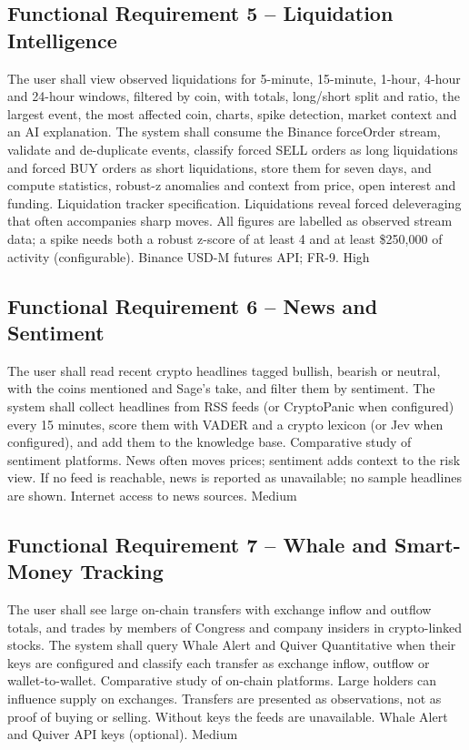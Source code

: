 \subsection{Functional Requirement 5 -- Liquidation Intelligence}
{The user shall view observed liquidations for 5-minute, 15-minute, 1-hour, 4-hour and 24-hour windows, filtered by coin, with totals, long/short split and ratio, the largest event, the most affected coin, charts, spike detection, market context and an AI explanation.}
{The system shall consume the Binance forceOrder stream, validate and de-duplicate events, classify forced SELL orders as long liquidations and forced BUY orders as short liquidations, store them for seven days, and compute statistics, robust-z anomalies and context from price, open interest and funding.}
{Liquidation tracker specification.}
{Liquidations reveal forced deleveraging that often accompanies sharp moves.}
{All figures are labelled as observed stream data; a spike needs both a robust z-score of at least 4 and at least \$250{,}000 of activity (configurable).}
{Binance USD-M futures API; FR-9.}
{High}

\subsection{Functional Requirement 6 -- News and Sentiment}
{The user shall read recent crypto headlines tagged bullish, bearish or neutral, with the coins mentioned and Sage's take, and filter them by sentiment.}
{The system shall collect headlines from RSS feeds (or CryptoPanic when configured) every 15 minutes, score them with VADER and a crypto lexicon (or Jev when configured), and add them to the knowledge base.}
{Comparative study of sentiment platforms.}
{News often moves prices; sentiment adds context to the risk view.}
{If no feed is reachable, news is reported as unavailable; no sample headlines are shown.}
{Internet access to news sources.}
{Medium}

\subsection{Functional Requirement 7 -- Whale and Smart-Money Tracking}
{The user shall see large on-chain transfers with exchange inflow and outflow totals, and trades by members of Congress and company insiders in crypto-linked stocks.}
{The system shall query Whale Alert and Quiver Quantitative when their keys are configured and classify each transfer as exchange inflow, outflow or wallet-to-wallet.}
{Comparative study of on-chain platforms.}
{Large holders can influence supply on exchanges.}
{Transfers are presented as observations, not as proof of buying or selling. Without keys the feeds are unavailable.}
{Whale Alert and Quiver API keys (optional).}
{Medium}

